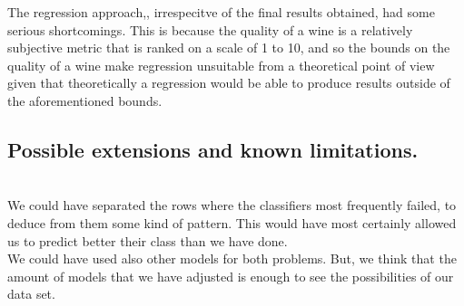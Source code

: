 \documentclass[10pt]{article}
\begin{document}
The regression approach,, irrespecitve of the final results obtained, had some serious shortcomings. This is because the quality of a wine is a relatively subjective metric that is ranked on a scale of 1 to 10, and so the bounds on the quality of a wine make regression unsuitable from a theoretical point of view given that theoretically a regression would be able to produce results outside of the aforementioned bounds.
\subsection{Possible extensions and known limitations.}
\ \\

We could have separated the rows where the classifiers most frequently failed, to deduce from them some kind of pattern. This would have most certainly allowed us to predict better their class than we have done.\\

We could have used also other models for both problems. But, we think that the amount of models that we have adjusted is enough to see the possibilities of our data set.
\end{document}
